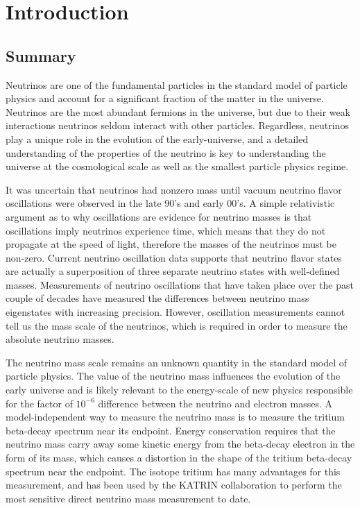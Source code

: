 
\chapter{Introduction} 
\label{chap:introduction}

\section{Summary}

Neutrinos are one of the fundamental particles in the standard model of particle physics and account for a significant fraction of the matter in the universe. Neutrinos are the most abundant fermions in the universe, but due to their weak interactions neutrinos seldom interact with other particles. Regardless, neutrinos play a unique role in the evolution of the early-universe, and a detailed understanding of the properties of the neutrino is key to understanding the universe at the cosmological scale as well as the smallest particle physics regime.

It was uncertain that neutrinos had nonzero mass until vacuum neutrino flavor oscillations were observed in the late 90's and early 00's. A simple relativistic argument as to why oscillations are evidence for neutrino masses is that oscillations imply neutrinos experience time, which means that they do not propagate at the speed of light, therefore the masses of the neutrinos must be non-zero. Current neutrino oscillation data supports that neutrino flavor states are actually a superposition of three separate neutrino states with well-defined masses. Measurements of neutrino oscillations that have taken place over the past couple of decades have measured the differences between neutrino mass eigenstates with increasing precision. However, oscillation measurements cannot tell us the mass scale of the neutrinos, which is required in order to measure the absolute neutrino masses.

The neutrino mass scale remains an unknown quantity in the standard model of particle physics. The value of the neutrino mass influences the evolution of the early universe and is likely relevant to the energy-scale of new physics responsible for the factor of $10^{-6}$ difference between the neutrino and electron masses. A model-independent way to measure the neutrino mass is to measure the tritium beta-decay spectrum near its endpoint. Energy conservation requires that the neutrino mass carry away some kinetic energy from the beta-decay electron in the form of its mass, which causes a distortion in the shape of the tritium beta-decay spectrum near the endpoint. The isotope tritium has many advantages for this measurement, and has been used by the KATRIN collaboration to perform the most sensitive direct neutrino mass measurement to date.

